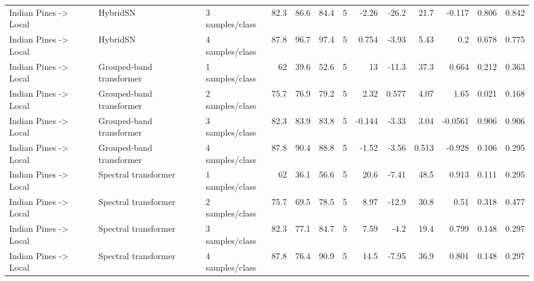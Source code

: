 \begin{table}
\begin{tabular}{lllrrrrrrrrrr}
Indian Pines -> Local & HybridSN & 3 samples/class & 82.3 & 86.6 & 84.4 & 5 & -2.26 & -26.2 & 21.7 & -0.117 & 0.806 & 0.842 \\
Indian Pines -> Local & HybridSN & 4 samples/class & 87.8 & 96.7 & 97.4 & 5 & 0.754 & -3.93 & 5.43 & 0.2 & 0.678 & 0.775 \\
Indian Pines -> Local & Grouped-band transformer & 1 samples/class & 62 & 39.6 & 52.6 & 5 & 13 & -11.3 & 37.3 & 0.664 & 0.212 & 0.363 \\
Indian Pines -> Local & Grouped-band transformer & 2 samples/class & 75.7 & 76.9 & 79.2 & 5 & 2.32 & 0.577 & 4.07 & 1.65 & 0.021 & 0.168 \\
Indian Pines -> Local & Grouped-band transformer & 3 samples/class & 82.3 & 83.9 & 83.8 & 5 & -0.144 & -3.33 & 3.04 & -0.0561 & 0.906 & 0.906 \\
Indian Pines -> Local & Grouped-band transformer & 4 samples/class & 87.8 & 90.4 & 88.8 & 5 & -1.52 & -3.56 & 0.513 & -0.928 & 0.106 & 0.295 \\
Indian Pines -> Local & Spectral transformer & 1 samples/class & 62 & 36.1 & 56.6 & 5 & 20.6 & -7.41 & 48.5 & 0.913 & 0.111 & 0.295 \\
Indian Pines -> Local & Spectral transformer & 2 samples/class & 75.7 & 69.5 & 78.5 & 5 & 8.97 & -12.9 & 30.8 & 0.51 & 0.318 & 0.477 \\
Indian Pines -> Local & Spectral transformer & 3 samples/class & 82.3 & 77.1 & 84.7 & 5 & 7.59 & -4.2 & 19.4 & 0.799 & 0.148 & 0.297 \\
Indian Pines -> Local & Spectral transformer & 4 samples/class & 87.8 & 76.4 & 90.9 & 5 & 14.5 & -7.95 & 36.9 & 0.801 & 0.148 & 0.297 \\
\bottomrule
\end{tabular}
\end{table}
